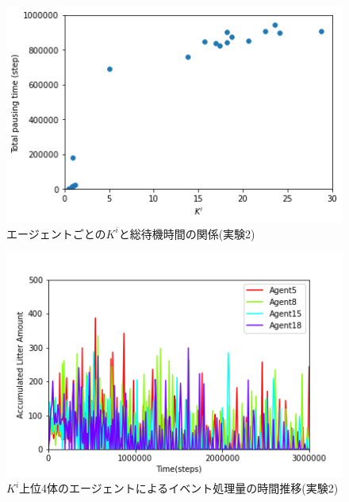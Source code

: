 \documentclass[12pt,a4j,twoside]{jarticle}
\begin{document}
  \begin{figure}
    \centering
    \includegraphics[width=150mm]{figures/CorrectionScatter_Complex_ER.png}
    \caption{エージェントごとの$K^i$と総待機時間の関係(実験2)}
    \label{fig:cscatter_ER_Complex}
  \end{figure}

  \begin{figure}
    \centering
    \includegraphics[width=150mm]{figures/al_graph_ER_Complex_top.png}
    \caption{$K^i$上位4体のエージェントによるイベント処理量の時間推移(実験2)}
    \label{fig:al_ER_Complex_top}
  \end{figure}
\end{document}
